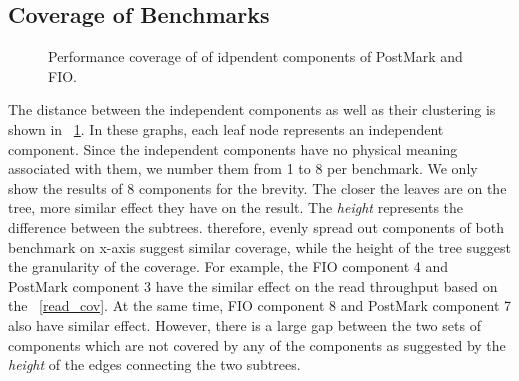 \subsection{Coverage of Benchmarks}
\begin{figure}[!t]
\centering
{}
\caption{Performance coverage of of idpendent components of PostMark and FIO.}
\label{cov}
\end{figure}
The distance between the independent components as well as their clustering is shown in \figurename~\ref{cov}. 
In these graphs, each leaf node represents an independent component. 
Since the independent components have no physical meaning associated with them, we number them from 1 to 8 per benchmark. 
We only show the results of 8 components for the brevity. The closer the leaves are on the tree, more similar effect they have on the result. The \emph{height} represents the difference between the subtrees. therefore, evenly spread out components of both benchmark on x-axis suggest similar coverage, while the height of the tree suggest the granularity of the coverage. For example, the FIO component 4 and PostMark component 3 have the similar effect on the read throughput based on the \figurename~\ref{read_cov}. At the same time, FIO component 8 and PostMark component 7 also have similar effect. However, there is a large gap between the two sets of components which are not covered by any of the components as suggested by the \emph{height} of the edges connecting the two subtrees.


